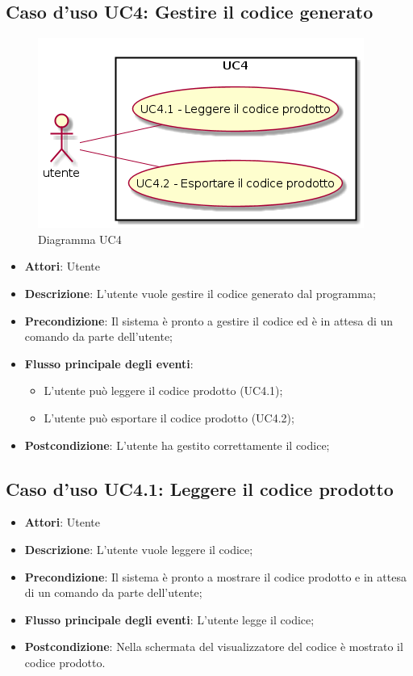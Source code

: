 \documentclass[../AnalisiDeiRequisiti.tex]{subfiles}
\begin{document}
					\subsection{Caso d'uso UC4: Gestire il codice generato}
					\begin{figure} [H]
						\centering
						\includegraphics[scale=0.45]{./Figures/UC4.png}
						\caption{Diagramma UC4}\label{}
					\end{figure}
					\begin{itemize}
						\item \textbf{Attori}: Utente
						\item \textbf{Descrizione}: L'utente vuole gestire il codice generato dal programma;
						\item \textbf{Precondizione}: Il sistema è pronto a gestire il codice ed è in attesa di un comando da parte dell'utente;
						\item \textbf{Flusso principale degli eventi}: \begin{itemize}
							\item L'utente può leggere il codice prodotto (UC4.1);
							\item L'utente può esportare il codice prodotto (UC4.2);
						\end{itemize}
						\item \textbf{Postcondizione}: L'utente ha gestito correttamente il codice;
					\end{itemize}
					\subsection{Caso d'uso UC4.1: Leggere il codice prodotto}
					\begin{itemize}
						\item \textbf{Attori}: Utente
						\item \textbf{Descrizione}: L'utente vuole leggere il codice;
						\item \textbf{Precondizione}: Il sistema è pronto a mostrare il codice prodotto e in attesa di un comando da parte dell'utente;
						\item \textbf{Flusso principale degli eventi}: L'utente legge il codice;
						\item \textbf{Postcondizione}: Nella schermata del visualizzatore del codice è mostrato il codice prodotto.
					\end{itemize}
\end{document}
